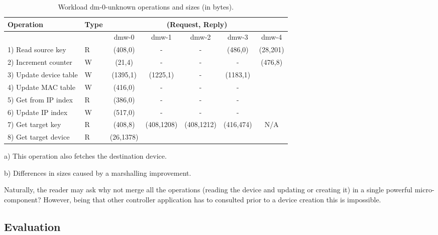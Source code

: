 \begin{table}[ht]
\small
\centering 
\begin{threeparttable}
\begin{tabular}{ll ccccc}
 Operation & Type &  \multicolumn{5}{c}{ (Request, Reply) } \\  \midrule
&  & dmw-0 & dmw-1  & dmw-2 & dmw-3 & dmw-4 \\ \toprule 
1) Read source key & R & (408,0) & - & - & (486,0) & (28,201)\tnote{a}\\
2) Increment counter & W & (21,4) & -  & - & - & \multirow{5}{*}{(476,8)} \\
3) Update device table & W & (1395,1) & (1225,1)\tnote{b}  & - &
(1183,1) & \\
4) Update MAC  table & W & (416,0) & - & - & -
& \\
5) Get from IP index & R & (386,0) & - & - & - & \\
6) Update IP index  & W & (517,0) & - & - & - & \\
7) Get target key & R & (408,8) &
\multirow{2}{*}{(408,1208)}\tnote{b} & \multirow{2}{*}{(408,1212)} &
\multirow{2}{*}{(416,474)} & \multirow{2}{*}{N/A}  \\ 
8) Get target device & R & (26,1378)  &  & & \\\bottomrule
\end{tabular}
\caption[Workload dm-0-unknown operations]{Workload dm-0-unknown operations
  and sizes (in bytes).}\label{table:dm-unknown-optimizations}
\begin{tablenotes}
\item [a)] This operation also fetches the destination device.
\item [b)] Differences in sizes caused by a marshalling improvement. 
\end{tablenotes}
\end{threeparttable}
\end{table}

Naturally, the reader may ask why not merge all the operations (reading the device and updating or creating it) in a single powerful 
micro-component? However, being that other controller application has to consulted prior to a device creation this is impossible. 

\subsection{Evaluation}


